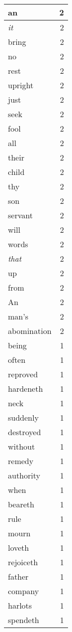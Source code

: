 \begin{center}
\begin{longtable}{l|r}
an & 2\\ \hline 
\emph{it} & 2\\ \hline 
bring & 2\\ \hline 
no & 2\\ \hline 
rest & 2\\ \hline 
upright & 2\\ \hline 
just & 2\\ \hline 
seek & 2\\ \hline 
fool & 2\\ \hline 
all & 2\\ \hline 
their & 2\\ \hline 
child & 2\\ \hline 
thy & 2\\ \hline 
son & 2\\ \hline 
servant & 2\\ \hline 
will & 2\\ \hline 
words & 2\\ \hline 
\emph{that} & 2\\ \hline 
up & 2\\ \hline 
from & 2\\ \hline 
An & 2\\ \hline 
man's & 2\\ \hline 
abomination & 2\\ \hline 
being & 1\\ \hline 
often & 1\\ \hline 
reproved & 1\\ \hline 
hardeneth & 1\\ \hline 
neck & 1\\ \hline 
suddenly & 1\\ \hline 
destroyed & 1\\ \hline 
without & 1\\ \hline 
remedy & 1\\ \hline 
authority & 1\\ \hline 
when & 1\\ \hline 
beareth & 1\\ \hline 
rule & 1\\ \hline 
mourn & 1\\ \hline 
loveth & 1\\ \hline 
rejoiceth & 1\\ \hline 
father & 1\\ \hline 
company & 1\\ \hline 
harlots & 1\\ \hline 
spendeth & 1\\ \hline 

\end{longtable}
\end{center}

